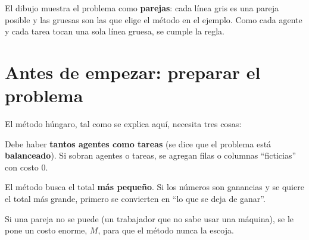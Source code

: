 \documentclass[11pt,a4paper]{article}
\begin{document}
\noindent\begin{minipage}[c]{0.52\textwidth}\centering
{}
\end{minipage}\hfill
\begin{minipage}[c]{0.44\textwidth}
El dibujo muestra el problema como \textbf{parejas}: cada línea gris es una pareja posible y las gruesas son las
que elige el método en el ejemplo. Como cada agente y cada tarea tocan una sola línea gruesa, se cumple la regla.
\end{minipage}
\par

\section{Antes de empezar: preparar el problema}

El método húngaro, tal como se explica aquí, necesita tres cosas:

\begin{description}[leftmargin=0pt, itemsep=5pt]
  \item[Una tabla cuadrada.] Debe haber \textbf{tantos agentes como tareas} (se dice que el problema está
        \textbf{balanceado}). Si sobran agentes o tareas, se agregan filas o columnas ``ficticias'' con costo 0.
  \item[Minimizar.] El método busca el total \textbf{más pequeño}. Si los números son ganancias y se quiere el
        total más grande, primero se convierten en ``lo que se deja de ganar''.
  \item[Todas las parejas permitidas.] Si una pareja no se puede (un trabajador que no sabe usar una máquina),
        se le pone un costo enorme, $M$, para que el método nunca la escoja.
\end{description}
\end{document}
